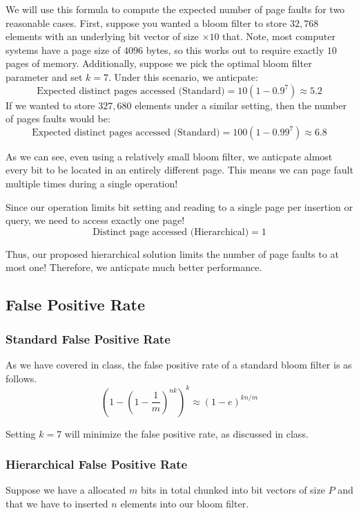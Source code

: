 We will use this formula to compute the expected number of page faults for two reasonable cases.
First, suppose you wanted a bloom filter to store $32,768$ elements with an underlying bit vector of size $\times 10$ that.
Note, most computer systems have a page size of $4096$ bytes, so this works out to require exactly $10$ pages of memory.
Additionally, suppose we pick the optimal bloom filter parameter and set $k=7$.
Under this scenario, we anticpate:
$$\text{Expected distinct pages accessed (Standard)} = 10(1-0.9^7) \approx 5.2$$
If we wanted to store $327,680$ elements under a similar setting, then the number of pages faults would be:
$$\text{Expected distinct pages accessed (Standard)} = 100(1-0.99^7) \approx 6.8$$

As we can see, even using a relatively small bloom filter, we anticpate almost every bit to be located in an entirely different page.
This means we can page fault multiple times during a single operation!

Since our operation limits bit setting and reading to a single page per insertion or query, we need to access exactly one page!
$$\text{Distinct page accessed (Hierarchical)} = 1$$

Thus, our proposed hierarchical solution limits the number of page faults to at most one!
Therefore, we anticpate much better performance.
\subsection{False Positive Rate}

\subsubsection{Standard False Positive Rate}

As we have covered in class, the false positive rate of a standard bloom filter is as follows.
\begin{equation}
    (1 - (1 - \frac{1}{m})^{nk})^k \approx (1  - e)^{kn/m}
\end{equation}

Setting $k=7$ will minimize the false positive rate, as discussed in class.

\subsubsection{Hierarchical False Positive Rate}
Suppose we have a allocated $m$ bits in total chunked into bit vectors of size $P$ and that we have to inserted $n$ elements into our bloom filter.

